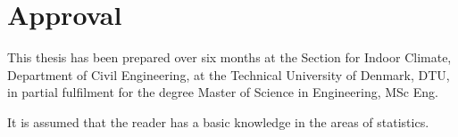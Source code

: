 \section*{Approval}
This thesis has been prepared over six months at the Section for Indoor Climate, Department of Civil Engineering, at the Technical University of Denmark, DTU, in partial fulfilment for the degree Master of Science in Engineering, MSc Eng. 

It is assumed that the reader has a basic knowledge in the areas of statistics. 

\vfill

\begin{center}
\namesigdate{\thesisauthor~-~\studentnumber}
\end{center}

\vfill

